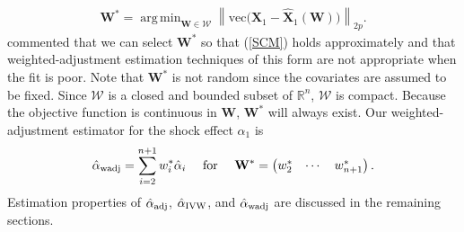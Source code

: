 \documentclass[11pt]{article}
\def\mbf#1{\mathbf{#1}} %
\def\mrm#1{\mathrm{#1}} %
\newcommand{\reals}{\mathbb{R}} %
\def\mc#1{\mathcal{#1}} %
\DeclareMathOperator*{\argmin}{arg\,min} %
\newcommand{\norm}[1]{\left\lVert#1\right\rVert} %
\theoremstyle{definition}
\begin{document}
\begin{align}
  \mbf{W}^* = \argmin_{\mbf{W}\in \mc{W}} \norm{\mrm{vec}\big(\mbf{X}_1-\hat{\mbf{X}}_1(\mbf{W})\big)}_{2p}. 
  \label{W}
\end{align}
\cite{abadie2010synthetic} commented that we can select $\mbf{W}^*$ 
so that (\ref{SCM}) holds approximately %
and that weighted-adjustment estimation techniques of this form are not 
appropriate when the fit is poor. 
Note that $\mbf{W}^*$ is not random since the covariates are assumed to be fixed. Since $\mc{W}$ is a closed and bounded subset of $\reals^n$,  $\mc{W}$ is compact. Because the objective function 
is continuous in $\mbf{W}$, $\mbf{W}^*$ will always exist. %
Our weighted-adjustment estimator for the shock effect $\alpha_1$ is
  \begin{align*}
    \hat{\alpha}_{\rm wadj} = \sum_{i=2}^{n+1} w_i^*\hat{\alpha}_i
    \quad \text{ for } \quad \mbf{W}^* = \begin{pmatrix}
      w^*_2 & \cdots & w^*_{n+1}
    \end{pmatrix}.
  \end{align*}
Estimation properties of $\hat{\alpha}_{\rm adj}$, $\hat{\alpha}_{\rm IVW}$, 
and $\hat{\alpha}_{\rm wadj}$ are discussed in the remaining sections.
\end{document}
